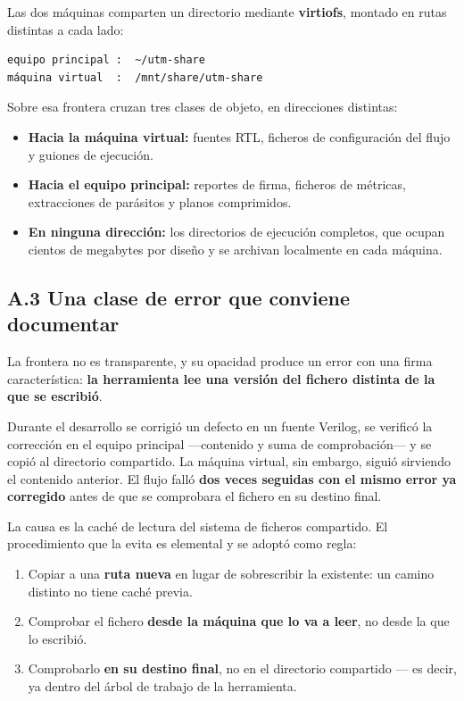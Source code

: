 Las dos máquinas comparten un directorio mediante \textbf{virtiofs},
montado en rutas distintas a cada lado:

\begin{verbatim}
equipo principal :  ~/utm-share
máquina virtual  :  /mnt/share/utm-share
\end{verbatim}

Sobre esa frontera cruzan tres clases de objeto, en direcciones
distintas:

\begin{itemize}
\tightlist
\item
  \textbf{Hacia la máquina virtual:} fuentes RTL, ficheros de
  configuración del flujo y guiones de ejecución.
\item
  \textbf{Hacia el equipo principal:} reportes de firma, ficheros de
  métricas, extracciones de parásitos y planos comprimidos.
\item
  \textbf{En ninguna dirección:} los directorios de ejecución completos,
  que ocupan cientos de megabytes por diseño y se archivan localmente en
  cada máquina.
\end{itemize}

\subsection{A.3 Una clase de error que conviene
documentar}\label{a.3-una-clase-de-error-que-conviene-documentar}

La frontera no es transparente, y su opacidad produce un error con una
firma característica: \textbf{la herramienta lee una versión del fichero
distinta de la que se escribió}.

Durante el desarrollo se corrigió un defecto en un fuente Verilog, se
verificó la corrección en el equipo principal ---contenido y suma de
comprobación--- y se copió al directorio compartido. La máquina virtual,
sin embargo, siguió sirviendo el contenido anterior. El flujo falló
\textbf{dos veces seguidas con el mismo error ya corregido} antes de que
se comprobara el fichero en su destino final.

La causa es la caché de lectura del sistema de ficheros compartido. El
procedimiento que la evita es elemental y se adoptó como regla:

\begin{enumerate}
\def\labelenumi{\arabic{enumi}.}
\tightlist
\item
  Copiar a una \textbf{ruta nueva} en lugar de sobrescribir la
  existente: un camino distinto no tiene caché previa.
\item
  Comprobar el fichero \textbf{desde la máquina que lo va a leer}, no
  desde la que lo escribió.
\item
  Comprobarlo \textbf{en su destino final}, no en el directorio
  compartido --- es decir, ya dentro del árbol de trabajo de la
  herramienta.
\end{enumerate}

